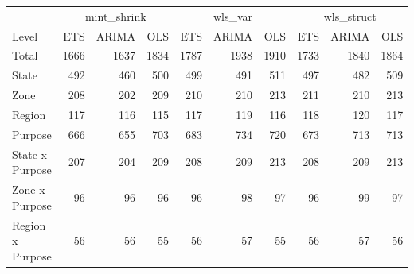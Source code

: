 \documentclass[11pt,a4paper,]{article}
\let\origtable\table
\let\endorigtable\endtable
\renewenvironment{table}[1][2] {
    \expandafter\origtable\expandafter[!htbp]
} {
    \endorigtable
}
\begin{document}
\begin{table}

\caption{\label{tab:Tourismdatadifrecrolling}Comparing Mean(RMSE) of three   different reconciliation matrices for rolling origin forecasts on a 24 months test set.}
\centering
\begin{tabular}[t]{lrrrrrrrrr}
\toprule
\multicolumn{1}{c}{} & \multicolumn{3}{c}{mint\_shrink} & \multicolumn{3}{c}{wls\_var} & \multicolumn{3}{c}{wls\_struct} \\
\cmidrule(l{3pt}r{3pt}){2-4} \cmidrule(l{3pt}r{3pt}){5-7} \cmidrule(l{3pt}r{3pt}){8-10}
Level & ETS & ARIMA & OLS & ETS & ARIMA & OLS & ETS & ARIMA & OLS\\
\midrule
Total & 1666 & 1637 & 1834 & 1787 & 1938 & 1910 & 1733 & 1840 & 1864\\
State & 492 & 460 & 500 & 499 & 491 & 511 & 497 & 482 & 509\\
Zone & 208 & 202 & 209 & 210 & 210 & 213 & 211 & 210 & 213\\
Region & 117 & 116 & 115 & 117 & 119 & 116 & 118 & 120 & 117\\
Purpose & 666 & 655 & 703 & 683 & 734 & 720 & 673 & 713 & 713\\
State x Purpose & 207 & 204 & 209 & 208 & 209 & 213 & 208 & 209 & 213\\
Zone x Purpose & 96 & 96 & 96 & 96 & 98 & 97 & 96 & 99 & 97\\
Region x Purpose & 56 & 56 & 55 & 56 & 57 & 55 & 56 & 57 & 56\\
\bottomrule
\end{tabular}
\end{table}
\end{document}
